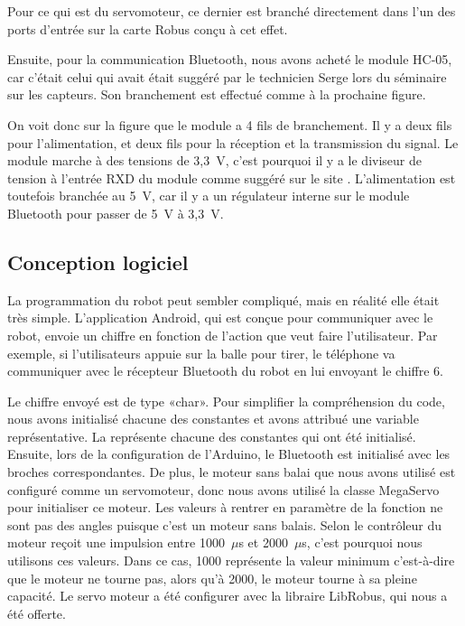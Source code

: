 
Pour ce qui est du servomoteur, ce dernier est branché directement dans l’un des ports d’entrée sur la carte Robus conçu à cet effet.

Ensuite, pour la communication Bluetooth, nous avons acheté le module HC-05, car c’était celui qui avait était suggéré par le technicien Serge lors du séminaire sur les capteurs.
Son branchement est effectué comme à la prochaine figure.


On voit donc sur la figure  que le module a 4 fils de branchement.
Il y a deux fils pour l’alimentation, et deux fils pour la réception et la transmission du signal.
Le module marche à des tensions de 3,3~V, c’est pourquoi il y a le diviseur de tension à l’entrée RXD du module comme suggéré sur le site \cite{noauthor_setting_nodate}.
L’alimentation est toutefois branchée au 5~V, car il y a un régulateur interne sur le module Bluetooth pour passer de 5~V à 3,3~V.

\subsection{Conception logiciel}



La programmation du robot peut sembler compliqué, mais en réalité elle était très simple.
L’application Android, qui est conçue pour communiquer avec le robot, envoie un chiffre en fonction de l’action que veut faire l’utilisateur.
Par exemple, si l’utilisateurs appuie sur la balle pour tirer, le téléphone va communiquer avec le récepteur Bluetooth du robot en lui envoyant le chiffre 6.


Le chiffre envoyé est de type «char».
Pour simplifier la compréhension du code, nous avons initialisé chacune des constantes et avons attribué une variable représentative.
La  représente chacune des constantes qui ont été initialisé.
Ensuite, lors de la configuration de l'Arduino, le Bluetooth est initialisé avec les broches correspondantes.
De plus, le moteur sans balai que nous avons utilisé est configuré comme un servomoteur, donc nous avons utilisé la classe MegaServo pour initialiser ce moteur.
Les valeurs à rentrer en paramètre de la fonction ne sont pas des angles puisque c’est un moteur sans balais.
Selon \cite{arduino_arduino_nodate} le contrôleur du moteur reçoit une impulsion entre 1000~$\mu$s et 2000~$\mu$s, c’est pourquoi nous utilisons ces valeurs.
Dans ce cas, 1000 représente la valeur minimum c’est-à-dire que le moteur ne tourne pas, alors qu’à 2000, le moteur tourne à sa pleine capacité.
Le servo moteur a été configurer avec la libraire LibRobus, qui nous a été offerte.

